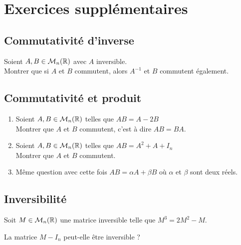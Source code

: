 \documentclass[oneside,12pt]{book}          %
\begin{document}
\section{Exercices supplémentaires}

\subsection{Commutativité d'inverse}
Soient $A,B\in\mathcal{M}_n({\mathbb R})$ avec $A$ inversible.\\
Montrer que si $A$ et $B$ commutent, alors $A^{-1}$ et $B$ commutent également.



\subsection{Commutativité et produit}
\begin{enumerate}
    \item Soient $A,B\in\mathcal{M}_n({\mathbb R})$ telles que $AB=A-2B$\\ 
    Montrer que $A$ et $B$ commutent, c'est à dire $AB=BA$.
    \item Soient $A,B\in\mathcal{M}_n({\mathbb R})$ telles que $AB=A^2+A+I_n$ \\
	Montrer que $A$ et $B$ commutent.
    \item Même question avec cette fois $AB=\alpha A + \beta B$ où $\alpha$ et $\beta$ sont deux réels.
\end{enumerate}



\subsection{Inversibilité}
Soit $M\in\mathcal{M}_n({\mathbb R})$ une matrice inversible telle que $M^3=2M^2-M$.

La matrice $M-I_n$ peut-elle être inversible ?
\end{document}

